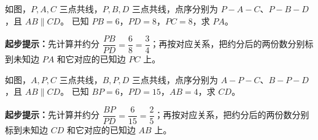 \documentclass{exam-zh}
\begin{document}

\begin{problem}[points=10]
  \noindent
  \begin{minipage}[t]{\dimexpr\linewidth-60mm-6mm\relax}
    \vspace{0pt}
    如图，$P,A,C$ 三点共线，$P,B,D$ 三点共线，点序分别为 $P-A-C$、$P-B-D$，且 $AB\parallel CD$。
已知 $PB=6$，$PD=8$，$PC=8$，求 $PA$。
    \begin{hintbox}
\textbf{起步提示：}先计算并约分 $\dfrac{PB}{PD}=\dfrac{6}{8}=\dfrac{3}{4}$；再按对应关系，把约分后的两份数分别标到未知边 $PA$ 和它对应的已知边 $PC$ 上。\end{hintbox}

  \end{minipage}\hfill
  \begin{diagramcoltikz}{60mm}{先看平行边方向，再判断 A 字型或 8 字型及对应边。}
  }
  \end{diagramcoltikz}
  \par\medskip
  \answerarea[42mm]
\end{problem}



\begin{problem}[points=10]
  \noindent
  \begin{minipage}[t]{\dimexpr\linewidth-60mm-6mm\relax}
    \vspace{0pt}
    如图，$A,P,C$ 三点共线，$B,P,D$ 三点共线，点序分别为 $A-P-C$、$B-P-D$，且 $AB\parallel CD$。
已知 $BP=6$，$PD=15$，$AB=4$，求 $CD$。
    \begin{hintbox}
\textbf{起步提示：}先计算并约分 $\dfrac{BP}{PD}=\dfrac{6}{15}=\dfrac{2}{5}$；再按对应关系，把约分后的两份数分别标到未知边 $CD$ 和它对应的已知边 $AB$ 上。\end{hintbox}

  \end{minipage}\hfill
  \begin{diagramcoltikz}{60mm}{先看平行边方向，再判断 A 字型或 8 字型及对应边。}
  }
  \end{diagramcoltikz}
  \par\medskip
  \answerarea[42mm]
\end{problem}
\end{document}
